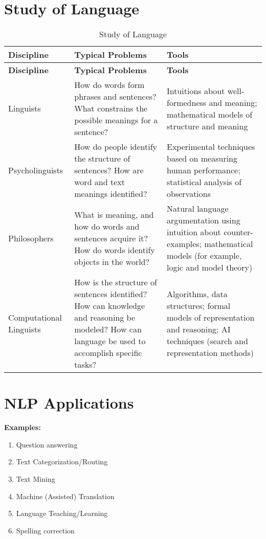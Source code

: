 \section{Study of Language}
\begin{longtable}{|p{4cm}|p{6cm}|p{6cm}|}
\caption{Study of Language}\\
\hline
\textbf{Discipline} & \textbf{Typical Problems} & \textbf{Tools} \\
\hline
\endfirsthead

\hline
\textbf{Discipline} & \textbf{Typical Problems} & \textbf{Tools} \\
\hline
\endhead

\hline
\endfoot

\hline
\endlastfoot

Linguists & How do words form phrases and sentences? What constrains the possible meanings for a sentence? & Intuitions about well-formedness and meaning; mathematical models of structure and meaning \\
\hline
Psycholinguists & How do people identify the structure of sentences? How are word and text meanings identified? & Experimental techniques based on measuring human performance; statistical analysis of observations \\
\hline
Philosophers & What is meaning, and how do words and sentences acquire it? How do words identify objects in the world? & Natural language argumentation using intuition about counter-examples; mathematical models (for example, logic and model theory) \\
\hline
Computational Linguists & How is the structure of sentences identified? How can knowledge and reasoning be modeled? How can language be used to accomplish specific tasks? & Algorithms, data structures; formal models of representation and reasoning; AI techniques (search and representation methods) \\
\hline

\end{longtable}

\section{NLP Applications}

\textbf{Examples:}
\begin{enumerate}
    \item Question answering
    \item Text Categorization/Routing
    \item Text Mining
    \item Machine (Assisted) Translation
    \item Language Teaching/Learning
    \item Spelling correction
\end{enumerate}

